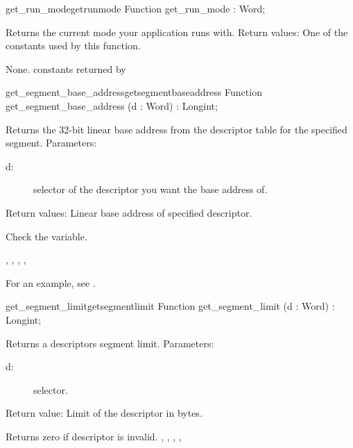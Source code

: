 \begin{functionl}{get\_run\_mode}{getrunmode}
\Declaration
Function get\_run\_mode  : Word;

\Description
Returns the current mode your application runs with.
Return values: One of the constants used by this function.

\Errors
None. 
\SeeAlso
 constants returned by   
\end{functionl}
\latex{}
\html{}
\begin{functionl}{get\_segment\_base\_address}{getsegmentbaseaddress}
\Declaration
Function get\_segment\_base\_address  
(d : Word) : Longint;

\Description
 Returns the 32-bit linear base address from the descriptor table for the
specified segment.
Parameters: 
\begin{description}
\item[d:\ ] selector of the descriptor you want the base address of.
\end{description}
Return values: Linear base address of specified descriptor.

\Errors
 Check the  variable.
\SeeAlso

,
, 
,
,

\end{functionl}
For an example, see 
.
\begin{functionl}{get\_segment\_limit}{getsegmentlimit}
\Declaration
Function get\_segment\_limit (d : Word) : Longint;

\Description
Returns a descriptors segment limit.
Parameters:
\begin{description}
\item [d:\ ] selector.
\end{description}
Return value: Limit of the descriptor in bytes.

\Errors
 Returns zero if descriptor is invalid. 
\SeeAlso
{},
, 
,
, 

\end{functionl}
